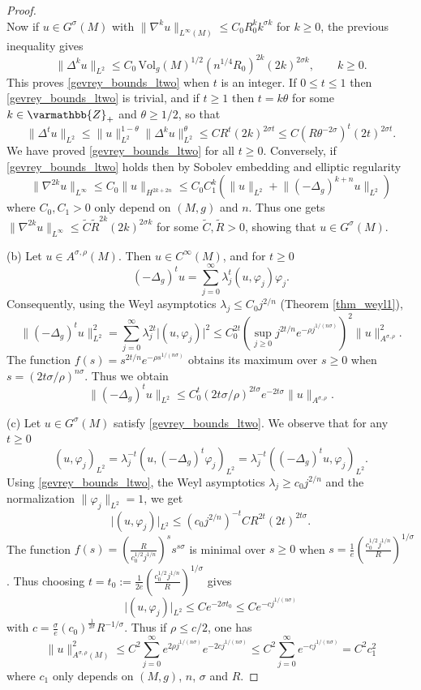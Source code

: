 \documentclass[12pt,twoside]{amsart}
\numberwithin{equation}{section}
\renewcommand{\leq}{\leqslant}
\renewcommand{\geq}{\geqslant}
\renewcommand{\mathbb}{\varmathbb}
\newcommand{\mZ}{\mathbb{Z}}                    %
\newcommand{\abs}[1]{\lvert #1 \rvert}          %
\newcommand{\norm}[1]{\lVert #1 \rVert}         %
\begin{document}
\begin{appendix}
\begin{proof}
\[\]
Now if $u \in G^{\sigma}(M)$ with $\norm{\nabla^k u}_{L^{\infty}(M)} \leq C_0 R_0^k k^{\sigma k}$ for $k \geq 0$, the previous inequality gives  
\[
\norm{\Delta^k u}_{L^2} \leq C_0 \,\mathrm{Vol}_g(M)^{1/2} (n^{1/4} R_0)^{2k} (2k)^{2\sigma k}, \qquad k \geq 0.
\]
This proves \eqref{gevrey_bounds_ltwo} when $t$ is an integer. If $0 \leq t \leq 1$ then \eqref{gevrey_bounds_ltwo} is trivial, and if $t \geq 1$ then $t = k\theta$ for some $k \in \mZ_+$ and $\theta \geq 1/2$, so that 
\[
\norm{\Delta^t u}_{L^2} \leq \norm{u}_{L^2}^{1-\theta} \norm{\Delta^k u}_{L^2}^{\theta} \leq C R^t (2k)^{2\sigma t} \leq C (R\theta^{-2\sigma})^t (2t)^{2\sigma t}.
\]
We have proved \eqref{gevrey_bounds_ltwo} for all $t \geq 0$. Conversely, if \eqref{gevrey_bounds_ltwo} holds then by Sobolev embedding and elliptic regularity 
\[
\norm{\nabla^{2k} u}_{L^{\infty}} \leq C_0 \norm{u}_{H^{2k+2n}} \leq C_0 C_1^k(\norm{u}_{L^2} + \norm{(-\Delta_g)^{k+n} u}_{L^2})
\]
where $C_0, C_1 > 0$ only depend on $(M,g)$ and $n$. Thus one gets $\norm{\nabla^{2k} u}_{L^{\infty}} \leq \tilde{C} \tilde{R}^{2k} (2k)^{2\sigma k}$ for some $\tilde{C}, \tilde{R} > 0$, showing that $u \in G^{\sigma}(M)$.

(b) Let $u \in A^{\sigma, \rho}(M)$. Then $u \in C^{\infty}(M)$, and for $t \geq 0$ 
\[
(-\Delta_g)^t u = \sum_{j=0}^{\infty} \lambda_j^t (u,\varphi_j) \varphi_j.
\]
Consequently,  using the Weyl asymptotics $\lambda_j \leq C_0 j^{2/n}$ (Theorem \ref{thm_weyl1}), 
\[
\norm{(-\Delta_g)^t u}_{L^2}^2 = \sum_{j=0}^{\infty} \lambda_j^{2t} \abs{(u,\varphi_j)}^2 \leq C_0^{2t} (\sup_{j \geq 0} j^{2t/n} e^{-\rho j^{1/(n\sigma)}})^2 \norm{u}_{A^{\sigma,\rho}}^2.
\]
The function $f(s) = s^{2t/n} e^{-\rho s^{1/(n\sigma)}}$ obtains its maximum over $s \geq 0$ when $s = (2t\sigma/\rho)^{n\sigma}$. Thus we obtain 
\[
\norm{(-\Delta_g)^t u}_{L^2} \leq C_0^t (2t\sigma/\rho)^{2t\sigma} e^{-2t\sigma} \norm{u}_{A^{\sigma,\rho}}.
\]


(c) Let $u \in G^{\sigma}(M)$ satisfy \eqref{gevrey_bounds_ltwo}. We observe that for any $t \geq 0$ 
\[
(u, \varphi_j)_{L^2} = \lambda_j^{-t} (u, (-\Delta_g)^t \varphi_j)_{L^2} = \lambda_j^{-t} ( (-\Delta_g)^t u, \varphi_j)_{L^2}.
\]
Using \eqref{gevrey_bounds_ltwo}, the Weyl asymptotics $\lambda_j \geq c_0 j^{2/n}$ and the normalization $\norm{\varphi_j}_{L^2} = 1$, we get 
\[
\abs{(u,\varphi_j)}_{L^2} \leq (c_0 j^{2/n})^{-t} C R^{2t} (2t)^{2t\sigma}.
\]
The function $f(s) = (\frac{R}{c_0^{1/2} j^{1/n}})^s s^{s\sigma}$ is minimal over $s \geq 0$ when $s = \frac{1}{e} (\frac{c_0^{1/2} j^{1/n}}{R})^{1/\sigma}$. Thus choosing $t = t_0 := \frac{1}{2e} (\frac{c_0^{1/2} j^{1/n}}{R})^{1/\sigma}$ gives 
\[
\abs{(u,\varphi_j)}_{L^2} \leq C e^{-2\sigma t_0} \leq C e^{-cj^{1/(n\sigma)}}
\]
with $c = \frac{\sigma}{e} (c_0)^{\frac{1}{2\sigma}} R^{-1/\sigma}$. Thus if $\rho \leq c/2$, one has 
\[
\norm{u}_{A^{\sigma,\rho}(M)}^2 \leq C^2 \sum_{j=0}^{\infty} e^{2\rho j^{1/(n\sigma)}} e^{-2cj^{1/(n\sigma)}} \leq C^2 \sum_{j=0}^{\infty} e^{-cj^{1/(n\sigma)}} = C^2 c_1^2
\]
where $c_1$ only depends on $(M,g)$, $n$, $\sigma$ and $R$.
\end{proof}




\end{appendix}
\end{document}

